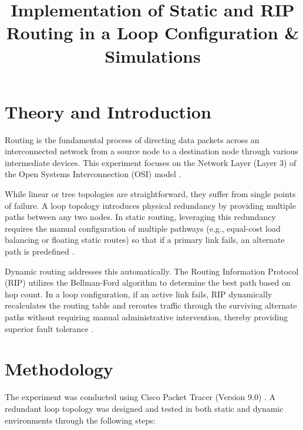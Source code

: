\documentclass[11pt]{article}
\title{Implementation of Static and RIP Routing in a Loop Configuration \& Simulations}
\author{}
\date{}
\begin{document}


\pagebreak

\tableofcontents

\pagebreak
{}
\maketitle

\section{Theory and Introduction}
Routing is the fundamental process of directing data packets across an interconnected network from a source node to a destination node through various intermediate devices. This experiment focuses on the Network Layer (Layer 3) of the Open Systems Interconnection (OSI) model \cite{tanenbaum2021}.

While linear or tree topologies are straightforward, they suffer from single points of failure. A loop topology introduces physical redundancy by providing multiple paths between any two nodes. In static routing, leveraging this redundancy requires the manual configuration of multiple pathways (e.g., equal-cost load balancing or floating static routes) so that if a primary link fails, an alternate path is predefined \cite{stallings2013}.

Dynamic routing addresses this automatically. The Routing Information Protocol (RIP) utilizes the Bellman-Ford algorithm to determine the best path based on hop count. In a loop configuration, if an active link fails, RIP dynamically recalculates the routing table and reroutes traffic through the surviving alternate paths without requiring manual administrative intervention, thereby providing superior fault tolerance \cite{tanenbaum2021}.

\section{Methodology}
The experiment was conducted using Cisco Packet Tracer (Version 9.0) \cite{packettracer2026}. A redundant loop topology was designed and tested in both static and dynamic environments through the following steps:
\end{document}
